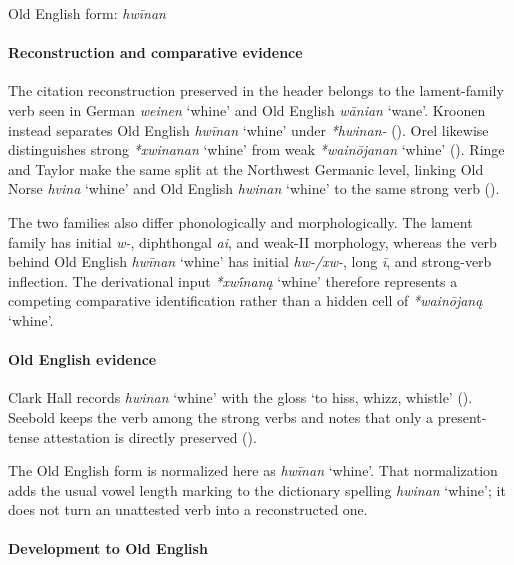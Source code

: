 \documentclass[
  british,
  a4paper,
]{article}
\providecommand{\Recon}[1]{\emph{*#1}}
\begin{document}
Old English form: \emph{hwīnan}

\paragraph{Reconstruction and comparative
evidence}\label{reconstruction-and-comparative-evidence-121}

The citation reconstruction preserved in the header belongs to the
lament-family verb seen in German {\emph{weinen}} `whine' and Old
English {\emph{wānian}} `wane'. Kroonen instead separates Old English
{\emph{hwīnan}} `whine' under \emph{*hwinan-}
(). Orel likewise
distinguishes strong \Recon{xwinanan} `whine' from weak
\Recon{wainōjanan} `whine' ().
Ringe and Taylor make the same split at the Northwest Germanic level,
linking Old Norse {\emph{hvina}} `whine' and Old English {\emph{hwinan}}
`whine' to the same strong verb ().

The two families also differ phonologically and morphologically. The
lament family has initial \emph{w-}, diphthongal \emph{ai}, and weak-II
morphology, whereas the verb behind Old English \emph{hwīnan} `whine'
has initial \emph{hw-/xw-}, long \emph{ī}, and strong-verb inflection.
The derivational input \Recon{xwī́naną} `whine' therefore represents a
competing comparative identification rather than a hidden cell of
\Recon{wainōjaną} `whine'.

\paragraph{Old English evidence}\label{old-english-evidence-123}

Clark Hall records {\emph{hwinan}} `whine' with the gloss `to hiss,
whizz, whistle' ().
Seebold keeps the verb among the strong verbs and notes that only a
present-tense attestation is directly preserved
().

The Old English form is normalized here as {\emph{hwīnan}} `whine'. That
normalization adds the usual vowel length marking to the dictionary
spelling {\emph{hwinan}} `whine'; it does not turn an unattested verb
into a reconstructed one.

\paragraph{Development to Old
English}\label{development-to-old-english-121}
\end{document}
